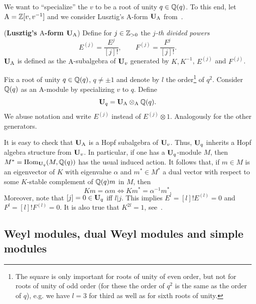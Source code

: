We want to ``specialize'' the $v$ to be a root of unity $q\in\mathbb{Q}(q)$. 
To this end, 
let $\mathrm{A}=\mathbb{Z}[v,v^{-1}]$ and we consider 
Lusztig's $\mathrm{A}$-form $\boldsymbol{\mathrm{U}}_{\mathrm{A}}$ from~\cite{lu2}.


\begin{defn}(\textbf{Lusztig's $\mathrm{A}$-form $\boldsymbol{\mathrm{U}}_{\mathrm{A}}$})\label{def-qA} Define for 
$j\in\mathbb{Z}_{>0}$ the \textit{$j$-th divided powers}
\[
E^{(j)}=\frac{E^{j}}{[j]!},\quad\quad F^{(j)}=\frac{F^{j}}{[j]!}.
\]
$\boldsymbol{\mathrm{U}}_{\mathrm{A}}$ is 
defined as the $\mathrm{A}$-subalgebra of 
$\boldsymbol{\mathrm{U}}_v$ generated by $K,K^{-1}$, $E^{(j)}$ and $F^{(j)}$.
\end{defn}




\begin{defn}\label{def-qq} Fix a root of unity 
$q\in\mathbb{Q}(q)$, $q\neq \pm 1$ and denote by 
$l$ the order\footnote{The square is only important for roots 
of unity of even order, but not 
for roots of unity of odd order (for these the order of $q^2$ is the same as 
the order of $q$), e.g. we have $l=3$ for third as well as for sixth roots of unity.} of $q^2$. Consider 
$\mathbb{Q}(q)$ as an $\mathrm{A}$-module by specializing $v$ to $q$. Define
\[
\boldsymbol{\mathrm{U}}_q=\boldsymbol{\mathrm{U}}_{\mathrm{A}}\otimes_{\mathrm{A}}\mathbb{Q}(q).
\]
We abuse notation and write $E^{(j)}$ instead 
of $E^{(j)}\otimes 1$. Analogously for the other generators.
\end{defn}




\begin{rem}\label{rem-indhopf}
It is easy to check that $\boldsymbol{\mathrm{U}}_{\mathrm{A}}$ is a Hopf 
subalgebra of $\boldsymbol{\mathrm{U}}_v$. Thus, $\boldsymbol{\mathrm{U}}_q$ inherits a Hopf algebra structure from $\boldsymbol{\mathrm{U}}_v$. 
In particular, if one has a $\boldsymbol{\mathrm{U}}_q$-module $M$, then 
$M^*=\mathrm{Hom}_{\boldsymbol{\mathrm{U}}_q}(M,\mathbb{Q}(q))$ has the usual induced action. 
It follows that, if $m\in M$ is an eigenvector of $K$ with 
eigenvalue $\alpha$ and $m^*\in M^*$ a dual vector with respect to 
some $K$-stable complement of $\mathbb{Q}(q) m$ in $M$, then
\begin{equation}\label{eq-eigen}
Km=\alpha m\Longleftrightarrow Km^*=\alpha^{-1}m^*.
\end{equation}
Moreover, note that $[j]=0\in\boldsymbol{\mathrm{U}}_q$ iff $l|j$. 
This implies 
$E^l=[l]!E^{(l)}=0$ and $F^l=[l]!F^{(l)}=0$. 
It is also true that $K^{2l}=1$, see~\cite[Lemma~4.4~(a)]{lu1}.
\end{rem}




\subsection{Weyl modules, dual Weyl modules and simple modules}\label{sub-wsmod}



